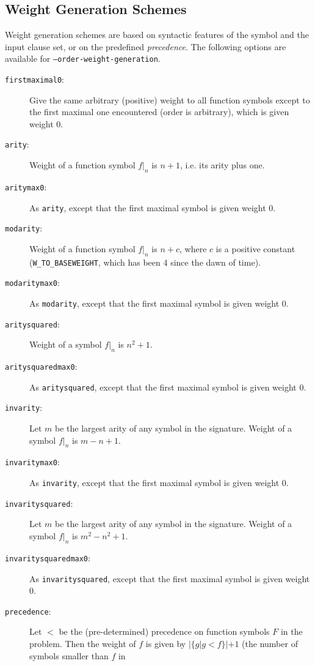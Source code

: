 \documentclass{report}
\begin{document}
\subsection{Weight Generation Schemes}

Weight generation schemes are based on syntactic features of the
symbol and the input clause set, or on the predefined
\emph{precedence}. The following options are available for
\texttt{--order-weight-generation}.


\begin{description}
\item[\texttt{firstmaximal0}:] Give the same arbitrary (positive)
  weight to all function symbols except to the first maximal one
  encountered (order is arbitrary), which is given weight 0.
\item[\texttt{arity}:] Weight of a function symbol $f|_n$ is $n+1$,
  i.e. its arity plus one.
\item[\texttt{aritymax0}:] As \texttt{arity}, except that the
  first maximal symbol is given weight 0.
\item[\texttt{modarity}:] Weight of a function symbol $f|_n$ is $n+c$,
  where $c$ is a positive constant (\texttt{W\_TO\_BASEWEIGHT}, which
  has been 4 since the dawn of time).
\item[\texttt{modaritymax0}:] As \texttt{modarity}, except that the
  first maximal symbol is given weight 0.
\item[\texttt{aritysquared}:] Weight of a symbol $f|_n$ is $n^2+1$.
\item[\texttt{aritysquaredmax0}:] As \texttt{aritysquared}, except
  that the first maximal symbol is given weight 0.
\item[\texttt{invarity}:] Let $m$ be the largest arity of any symbol
  in the signature.  Weight of a symbol $f|_n$ is $m-n+1$.
\item[\texttt{invaritymax0}:] As \texttt{invarity}, except
  that the first maximal symbol is given weight 0.
\item[\texttt{invaritysquared}:] Let $m$ be the largest arity of any symbol
  in the signature.  Weight of a symbol $f|_n$ is $m^2-n^2+1$.
\item[\texttt{invaritysquaredmax0}:] As \texttt{invaritysquared},
  except that the first maximal symbol is given weight 0.
\item[\texttt{precedence}:] Let $<$ be the (pre-determined) precedence
  on function symbols $F$ in the problem. Then the weight of $f$ is
  given by $|\{g|g<f\}|+1$ (the number of symbols smaller than $f$ in

\end{description}
\end{document}
